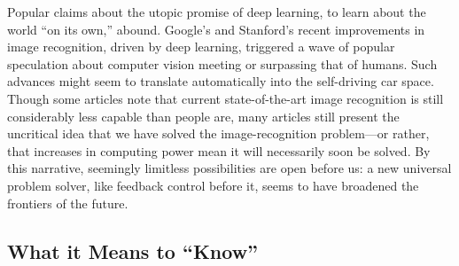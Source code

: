 Popular claims
about the utopic promise of deep learning, to
learn about the world ``on its own,''
abound. Google's and Stanford's recent
improvements in image recognition, driven by deep learning,
\cite{markoffImage} triggered a wave 
of popular speculation about computer vision meeting or surpassing
that of humans. Such
advances might seem to translate automatically into the self-driving
car space. Though some articles note that current
state-of-the-art image recognition is still considerably less capable
than people are, many articles still present the uncritical idea that we have solved
the image-recognition problem---or rather, that increases in computing
power mean it will necessarily soon be solved. By this narrative, seemingly limitless
possibilities are open before us: a new universal problem solver, like
feedback control before it, seems to have broadened the frontiers
of the future. 


\subsection{What it Means to ``Know''}

